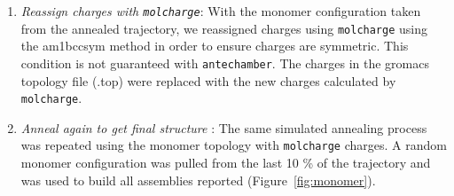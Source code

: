 \documentclass{article}
\begin{document}
\begin{enumerate}
	\item \textit{Reassign charges with \texttt{molcharge}}: With the monomer
	configuration taken from the annealed trajectory, we reassigned charges using
	\texttt{molcharge} using the am1bccsym method in order to ensure charges 
	are symmetric. This condition is not guaranteed with \texttt{antechamber}. 
	The charges in the gromacs topology file (.top) were replaced with the 
	new charges calculated by \texttt{molcharge}. 
	\item \textit{Anneal again to get final structure} : The same simulated
	annealing process was repeated using the monomer topology with
	\texttt{molcharge} charges. A random monomer configuration was pulled from
	the last 10 \% of the trajectory and was used to build all assemblies
	reported (Figure~\ref{fig:monomer}).
  \end{enumerate} 
\end{document}
